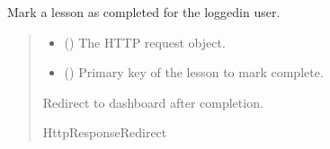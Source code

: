 \documentclass[letterpaper,10pt,english]{sphinxmanual}
\begin{document}
\begin{fulllineitems}
\label{\detokenize{courses:courses.views.complete_lesson}}
\pysigstartsignatures
\pysiglinewithargsret
{}
{\sphinxparamcomma {}}
{}
\pysigstopsignatures
\sphinxAtStartPar
Mark a lesson as completed for the logged\sphinxhyphen{}in user.
\begin{quote}\begin{description}
\begin{itemize}
\item {} 
\sphinxAtStartPar
{} () \textendash{} The HTTP request object.

\item {} 
\sphinxAtStartPar
{} () \textendash{} Primary key of the lesson to mark complete.

\end{itemize}

\sphinxAtStartPar
Redirect to dashboard after completion.

\sphinxAtStartPar
HttpResponseRedirect

\end{description}\end{quote}

\end{fulllineitems}


\begin{fulllineitems}
\label{\detokenize{courses:courses.views.create_theme}}
\pysigstartsignatures
\pysiglinewithargsret
{}
{}
{}
\pysigstopsignatures
\end{fulllineitems}

\end{document}
